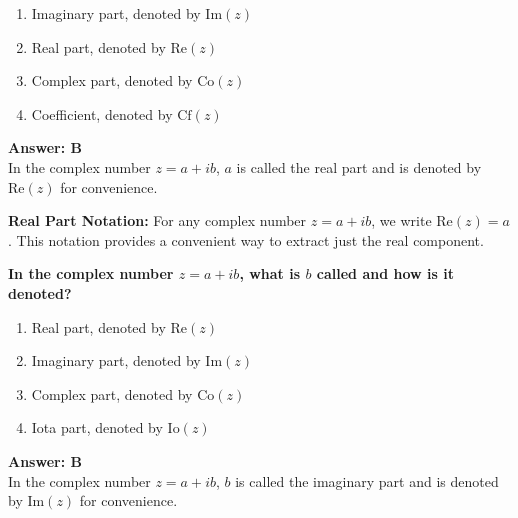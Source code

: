 \documentclass[12pt,a4paper]{article}
\begin{document}
\begin{partbox}[Options]
\begin{enumerate}[label=\Alph*.]
    \item Imaginary part, denoted by \( \text{Im}(z) \)
    \item Real part, denoted by \( \text{Re}(z) \)
    \item Complex part, denoted by \( \text{Co}(z) \)
    \item Coefficient, denoted by \( \text{Cf}(z) \)
\end{enumerate}
\end{partbox}

\begin{answerstyle}
\textbf{Answer: B} \\
In the complex number \( z = a + ib \), \( a \) is called the real part and is denoted by \( \text{Re}(z) \) for convenience.
\end{answerstyle}

\begin{conceptbox}
\textbf{Real Part Notation:} For any complex number \( z = a + ib \), we write \( \text{Re}(z) = a \). This notation provides a convenient way to extract just the real component.
\end{conceptbox}

\newpage
\begin{questiontitle}[MCQ 22]
\textbf{In the complex number \( z = a + ib \), what is \( b \) called and how is it denoted?}
\end{questiontitle}

\begin{partbox}[Options]
\begin{enumerate}[label=\Alph*.]
    \item Real part, denoted by \( \text{Re}(z) \)
    \item Imaginary part, denoted by \( \text{Im}(z) \)
    \item Complex part, denoted by \( \text{Co}(z) \)
    \item Iota part, denoted by \( \text{Io}(z) \)
\end{enumerate}
\end{partbox}

\begin{answerstyle}
\textbf{Answer: B} \\
In the complex number \( z = a + ib \), \( b \) is called the imaginary part and is denoted by \( \text{Im}(z) \) for convenience.
\end{answerstyle}
\end{document}
